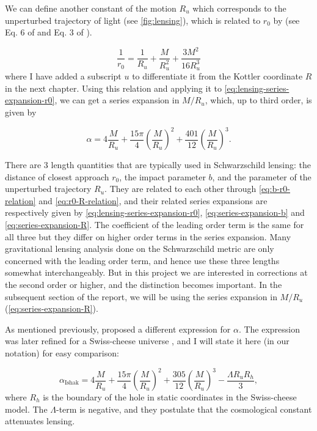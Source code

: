 We can define another constant of the motion $R_u$ which corresponds to the unperturbed trajectory of light (see \autoref{fig:lensing}), which is related to $r_0$ by (see Eq. 6 of \citet{ishak2008new} and Eq. 3 of \citet{butcher2016no}).

\begin{equation}
  \frac{1}{r_0} = \frac{1}{R_u} + \frac{M}{R_u^2} + \frac{3M^2}{16R_u^3}
  \label{eq:r0-R-relation}
\end{equation}
where I have added a subscript $u$ to differentiate it from the Kottler coordinate $R$ in the next chapter. Using this relation and applying it to \autoref{eq:lensing-series-expansion-r0}, we can get a series expansion in $M/R_u$, which, up to third order, is given by

\begin{equation}
  \alpha = 4 \frac{M}{R_u} + \frac{15\pi}{4} \left ( \frac{M}{R_u} \right )^2 + \frac{401}{12} \left ( \frac{M}{R_u} \right )^3.
  \label{eq:series-expansion-R}
\end{equation}

There are 3 length quantities that are typically used in Schwarzschild lensing: the distance of closest approach $r_0$, the impact parameter $b$, and the parameter of the unperturbed trajectory $R_u$. They are related to each other through \autoref{eq:b-r0-relation} and \autoref{eq:r0-R-relation}, and their related series expansions are respectively given by \autoref{eq:lensing-series-expansion-r0}, \autoref{eq:series-expansion-b} and \autoref{eq:series-expansion-R}. The coefficient of the leading order term is the same for all three but they differ on higher order terms in the series expansion. Many gravitational lensing analysis done on the Schwarzschild metric are only concerned with the leading order term, and hence use these three lengths somewhat interchangeably. But in this project we are interested in corrections at the second order or higher, and the distinction becomes important. In the subsequent section of the report, we will be using the series expansion in $M/R_u$ (\autoref{eq:series-expansion-R}). 

As mentioned previously, \citet{rindler2007contribution} proposed a different expression for $\alpha$. The expression was later refined for a Swiss-cheese universe \citep{ishak2008new}, and I will state it here (in our notation) for easy comparison:

\begin{equation}
  \alpha_{\text{Ishak}} = 4 \frac{M}{R_u} + \frac{15\pi}{4} \left ( \frac{M}{R_u} \right )^2 + \frac{305}{12} \left ( \frac{M}{R_u} \right )^3 - \frac{\Lambda R_u R_h}{3},
  \label{eq:rindler-ishak-alpha}
\end{equation}
where $R_h$ is the boundary of the hole in static coordinates in the Swiss-cheese model. The $\Lambda$-term is negative, and they postulate that the cosmological constant attenuates lensing. 

